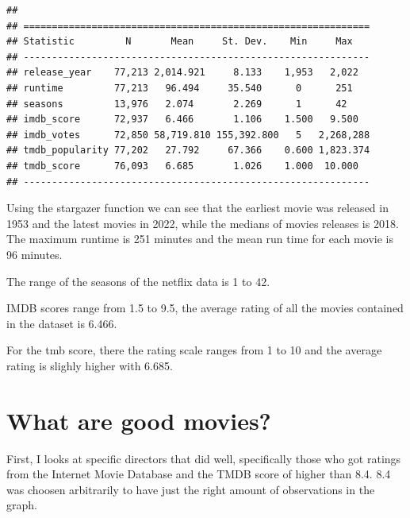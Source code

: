\documentclass[11pt,preprint, authoryear]{elsarticle}
\numberwithin{equation}{section}
\numberwithin{figure}{section}
\numberwithin{table}{section}
\begin{document}
\begin{verbatim}
## 
## =============================================================
## Statistic         N       Mean     St. Dev.    Min     Max   
## -------------------------------------------------------------
## release_year    77,213 2,014.921     8.133    1,953   2,022  
## runtime         77,213   96.494     35.540      0      251   
## seasons         13,976   2.074       2.269      1      42    
## imdb_score      72,937   6.466       1.106    1.500   9.500  
## imdb_votes      72,850 58,719.810 155,392.800   5   2,268,288
## tmdb_popularity 77,202   27.792     67.366    0.600 1,823.374
## tmdb_score      76,093   6.685       1.026    1.000  10.000  
## -------------------------------------------------------------
\end{verbatim}

Using the stargazer function we can see that the earliest movie was
released in 1953 and the latest movies in 2022, while the medians of
movies releases is 2018. The maximum runtime is 251 minutes and the mean
run time for each movie is 96 minutes.

The range of the seasons of the netflix data is 1 to 42.

IMDB scores range from 1.5 to 9.5, the average rating of all the movies
contained in the dataset is 6.466.

For the tmb score, there the rating scale ranges from 1 to 10 and the
average rating is slighly higher with 6.685.

\hypertarget{what-are-good-movies}{%
\section{What are good movies?}\label{what-are-good-movies}}

First, I looks at specific directors that did well, specifically those
who got ratings from the Internet Movie Database and the TMDB score of
higher than 8.4. 8.4 was choosen arbitrarily to have just the right
amount of observations in the graph.
\end{document}

